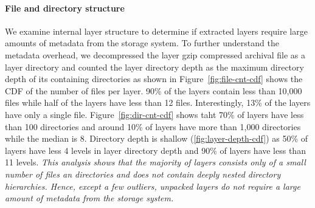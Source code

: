 


\paragraph{File and directory structure}





We examine internal layer structure to determine if extracted
layers require large amounts of metadata from the storage system.
%
To further understand the metadata overhead, we decompressed the layer gzip
compressed archival file as a layer directory and counted the layer directory
depth as the maximum directory depth of its containing directories as shown in
%
Figure~\ref{fig:file-cnt-cdf} shows the CDF of the number of files per layer.
%
90\% of the layers contain less than 10,000 files while half of the layers have
less than 12 files.
%
Interestingly, 13\% of the layers have only a single file.
%
%
Figure~\ref{fig:dir-cnt-cdf} shows taht 70\% of layers have less than 100
directories and around 10\% of layers have more than 1,000 directories while
the median is 8.
%
Directory depth is shallow (\ref{fig:layer-depth-cdf}) as 50\% of layers have
less 4 levels in layer directory depth and 90\% of layers have less than 11
levels.
%
\emph{This analysis shows that the majority of layers consists only of a small
number of files an directories and does not contain deeply nested directory
hierarchies.
%
Hence, except a few outliers, unpacked layers do not require a large amount of
metadata from the storage system.}


